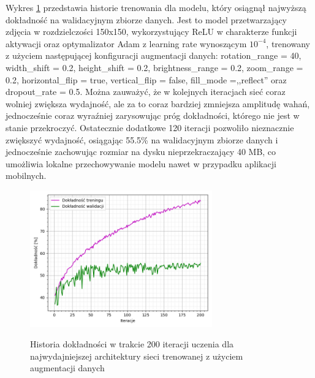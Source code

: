 Wykres \ref{pic:5.5} przedstawia historie trenowania dla modelu, który osiągnął najwyższą dokładność na walidacyjnym zbiorze danych. Jest to model przetwarzający zdjęcia w rozdzielczości 150x150, wykorzystujący ReLU w charakterze funkcji aktywacji oraz optymalizator Adam z learning rate wynoszącym $10^{-4}$, trenowany z użyciem następującej konfiguracji augmentacji danych: rotation\_range = 40, width\_shift = 0.2, height\_shift = 0.2, brightness\_range = 0.2, zoom\_range = 0.2, horizontal\_flip = true, vertical\_flip = false, fill\_mode =,,reflect'' oraz dropout\_rate = 0.5. Można zauważyć, że w kolejnych iteracjach sieć coraz wolniej zwiększa wydajność, ale za to coraz bardziej zmniejsza amplitudę wahań, jednocześnie coraz wyraźniej zarysowując próg dokładności, którego nie jest w stanie przekroczyć. Ostatecznie dodatkowe 120 iteracji pozwoliło nieznacznie zwiększyć wydajność, osiągając 55.5\% na walidacyjnym zbiorze danych i jednocześnie zachowując rozmiar na dysku nieprzekraczający 40 MB, co umożliwia lokalne przechowywanie modelu nawet w przypadku aplikacji mobilnych.

\begin{figure}[H]
    \caption{Historia dokładności w trakcie 200 iteracji uczenia dla najwydajniejszej architektury sieci trenowanej z użyciem augmentacji danych}
    \centering
    \includegraphics[width=0.7\textwidth]{wykres5.png}
    \label{pic:5.5}
\end{figure}

